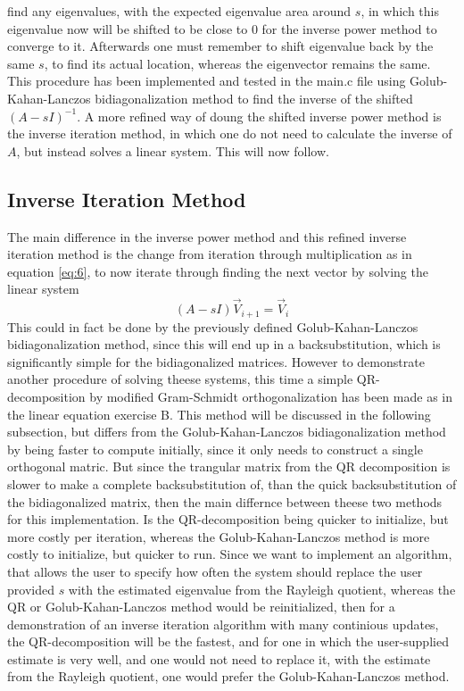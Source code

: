 \documentclass[twocolumn]{article}
\begin{document}
find any eigenvalues, with the expected eigenvalue area around $s$, in which this eigenvalue now will be shifted to be close to $0$ for the inverse power method to converge to it. Afterwards one must remember to shift eigenvalue back by the same $s$, to find its actual location, whereas the eigenvector remains the same. This procedure has been implemented and tested in the main.c file using Golub-Kahan-Lanczos bidiagonalization method to find the inverse of the shifted $\left( A - sI \right)^{-1}$.
A more refined way of doung the shifted inverse power method is the inverse iteration method, in which one do not need to calculate the inverse of $A$, but instead solves a linear system. This will now follow. 

\subsection{Inverse Iteration Method}
The main difference in the inverse power method and this refined inverse iteration method is the change from iteration through multiplication as in equation \eqref{eq:6}, to now iterate through finding the next vector by solving the linear system
\begin{equation}
\left(A - sI\right) \vec{V}_{i+1} =  \vec{V}_i \label{eq:6}
\end{equation}
This could in fact be done by the previously defined Golub-Kahan-Lanczos bidiagonalization method, since this will end up in a backsubstitution, which is significantly simple for the bidiagonalized matrices. However to demonstrate another procedure of solving theese systems, this time a simple QR-decomposition by modified Gram-Schmidt orthogonalization has been made as in the linear equation exercise B. This method will be discussed in the following subsection, but differs from the Golub-Kahan-Lanczos bidiagonalization method by being faster to compute initially, since it only needs to construct a single orthogonal matric. But since the trangular matrix from the QR decomposition is slower to make a complete backsubstitution of, than the quick backsubstitution of the bidiagonalized matrix, then the main differnce between theese two methods for this implementation. Is the QR-decomposition being quicker to initialize, but more costly per iteration, whereas the Golub-Kahan-Lanczos method is more costly to initialize, but quicker to run. Since we want to implement an algorithm, that allows the user to specify how often the system should replace the user provided $s$ with the estimated eigenvalue from the Rayleigh quotient, whereas the QR or Golub-Kahan-Lanczos method would be reinitialized, then for a demonstration of an inverse iteration algorithm with many continious updates, the QR-decomposition will be the fastest, and for one in which the user-supplied estimate is very well, and one would not need to replace it, with the estimate from the Rayleigh quotient, one would prefer the Golub-Kahan-Lanczos method. \\
\end{document}
